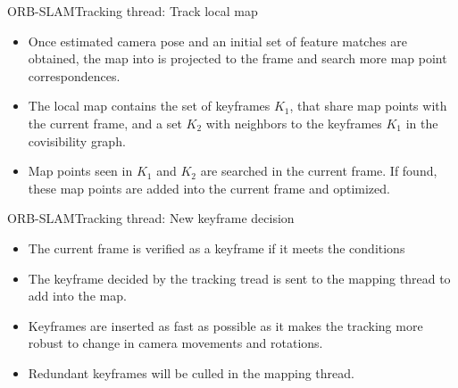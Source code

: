 \documentclass{beamer}
\begin{document}
\begin{frame}{ORB-SLAM}{Tracking thread: Track local map}
    \begin{itemize}
        \item{
        Once estimated camera pose and an initial set of feature matches are obtained, the map into is projected to the frame and search more map point correspondences.
        }
        \item{
        The local map contains the set of keyframes $K_{1}$, that share map points with the current frame, and a set $K_{2}$ with neighbors to the keyframes $K_{1}$ in the covisibility graph.
        }
        \item{
        Map points seen in $K_{1}$ and $K_{2}$ are searched in the current frame. If found, these map points are added into the current frame and optimized.
        }
    \end{itemize}
\end{frame}

\begin{frame}{ORB-SLAM}{Tracking thread: New keyframe decision}
    \begin{itemize}
        \item{
        The current frame is verified as a keyframe if it meets the conditions
        }
        \item{
        The keyframe decided by the tracking tread is sent to the mapping thread to add into the map.
        }
        \item{
        Keyframes are inserted as fast as possible as it makes the tracking more robust to change in camera movements and rotations.
        }
        \item{
        Redundant keyframes will be culled in the mapping thread.
        }
    \end{itemize}
\end{frame}
\end{document}
